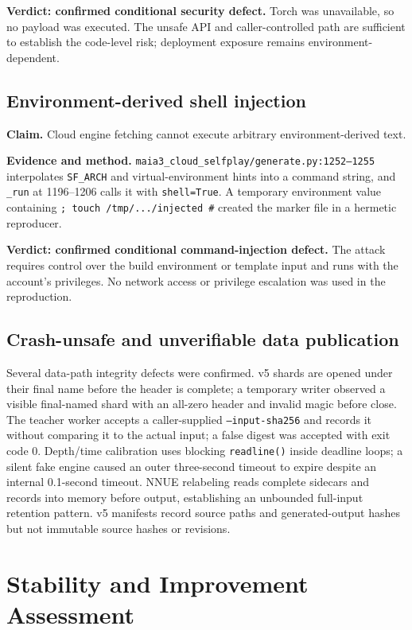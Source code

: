 \documentclass[conference]{IEEEtran}
\newcommand{\code}[1]{\texttt{\small #1}}
\begin{document}
\textbf{Verdict: confirmed conditional security defect.} Torch was unavailable, so no payload was executed. The unsafe API and caller-controlled path are sufficient to establish the code-level risk; deployment exposure remains environment-dependent.

\subsection{Environment-derived shell injection}
\textbf{Claim.} Cloud engine fetching cannot execute arbitrary environment-derived text.

\textbf{Evidence and method.} \code{maia3\_cloud\_selfplay/generate.py:1252--1255} interpolates \code{SF\_ARCH} and virtual-environment hints into a command string, and \code{\_run} at 1196--1206 calls it with \code{shell=True}. A temporary environment value containing \code{; touch /tmp/.../injected \#} created the marker file in a hermetic reproducer.

\textbf{Verdict: confirmed conditional command-injection defect.} The attack requires control over the build environment or template input and runs with the account's privileges. No network access or privilege escalation was used in the reproduction.

\subsection{Crash-unsafe and unverifiable data publication}
Several data-path integrity defects were confirmed. v5 shards are opened under their final name before the header is complete; a temporary writer observed a visible final-named shard with an all-zero header and invalid magic before close. The teacher worker accepts a caller-supplied \code{--input-sha256} and records it without comparing it to the actual input; a false digest was accepted with exit code 0. Depth/time calibration uses blocking \code{readline()} inside deadline loops; a silent fake engine caused an outer three-second timeout to expire despite an internal 0.1-second timeout. NNUE relabeling reads complete sidecars and records into memory before output, establishing an unbounded full-input retention pattern. v5 manifests record source paths and generated-output hashes but not immutable source hashes or revisions.

\section{Stability and Improvement Assessment}
\end{document}
